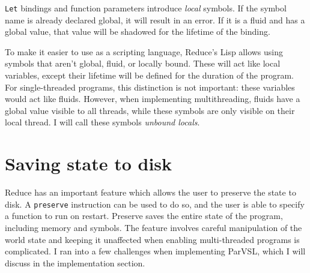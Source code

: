 \texttt{Let} bindings and function parameters introduce \emph{local} symbols. If the symbol name is already declared global,
it will result in an error. If it is a fluid and has a global value, that value will be shadowed for the lifetime
of the binding.

To make it easier to use as a scripting language, Reduce's Lisp allows using symbols that aren't global, fluid,
or locally bound. These will act like local variables, except their lifetime will be defined for the duration of the
program. For single-threaded programs, this distinction is not important: these variables would act like fluids. However,
when implementing multithreading, fluids have a global value visible to all threads, while these symbols are only
visible on their local thread. I will call these symbols \emph{unbound locals}.

\section{Saving state to disk}
Reduce has an important feature which allows the user to preserve the state to disk. A \texttt{preserve} instruction can be
used to do so, and the user is able to specify a function to run on restart. Preserve saves the entire state of the
program, including memory and symbols. The feature involves careful manipulation of the world state and keeping it
unaffected when enabling multi-threaded programs is complicated. I ran into a few challenges when implementing ParVSL,
which I will discuss in the implementation section.

